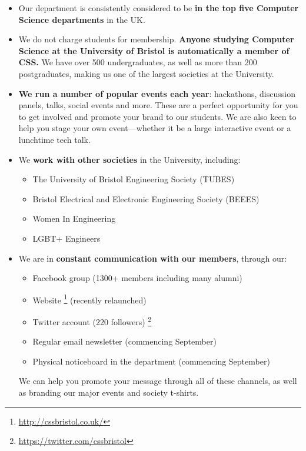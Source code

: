\documentclass[]{article}
\begin{document}
\begin{itemize}
	\item Our department is consistently considered to be \textbf{in the top five Computer Science departments} in the UK.
	\item We do not charge students for membership. \textbf{Anyone studying Computer Science at the University of Bristol is automatically a member of CSS.} We have over 500 undergraduates, as well as more than 200 postgraduates, making us one of the largest societies at the University.
	\item \textbf{We run a number of popular events each year}: hackathons, discussion panels, talks, social events and more. These are a perfect opportunity for you to get involved and promote your brand to our students. We are also keen to help you stage your own event---whether it be a large interactive event or a lunchtime tech talk.
	\item We \textbf{work with other societies} in the University, including:
			\begin{itemize}
				\item The University of Bristol Engineering Society (TUBES)
				\item Bristol Electrical and Electronic Engineering Society (BEEES)
				\item Women In Engineering
				\item LGBT+ Engineers
			\end{itemize}
	\item We are in \textbf{constant communication with our members}, through our:
			\begin{itemize}
				\item Facebook group (1300+ members including many alumni)
				\item Website \footnote{\url{http://cssbristol.co.uk/}} (recently relaunched)
				\item Twitter account (220 followers) \footnote{\url{https://twitter.com/cssbristol}}
				\item Regular email newsletter (commencing September)
                \item Physical noticeboard in the department (commencing September)
			\end{itemize}
		 We can help you promote your message through all of these channels, as well as branding our major events and society t-shirts.
\end{itemize}
\end{document}
